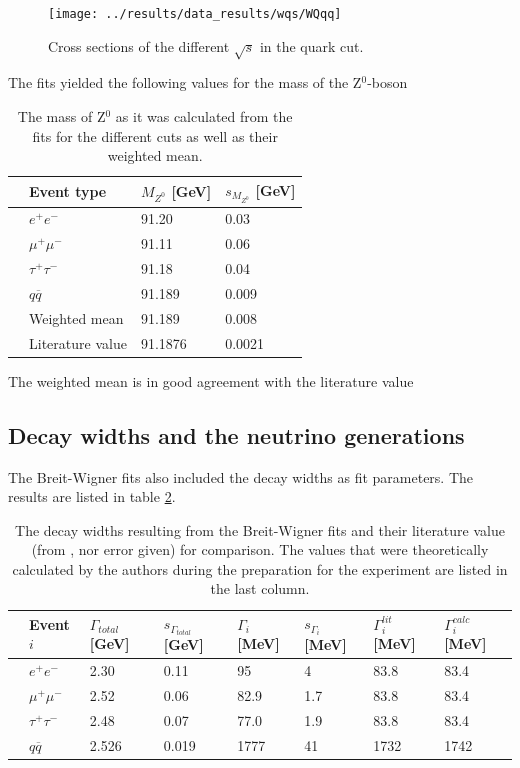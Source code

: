 \begin{figure}[H]
\centering
\texttt{[image: ../results/data\_results/wqs/WQqq]}
\caption[Cross sections for quark cut]{Cross sections of the different $\sqrt{s}$ in the quark cut.}
\label{fig:WQqq}
\end{figure}
\newpage
The fits yielded the following values for the mass of the Z$^0$-boson
\begin{table}[H]\centering
	\begin{tabular}{@{}llll@{}}
		\toprule
		&Event type&$M_{Z^0}$ [GeV]&$s_{M_{Z^0}}$ [GeV]\\
		\midrule
		&$e^+e^-$&91.20&0.03\\
		&$\mu^+\mu^-$&91.11&0.06\\
		&$\tau^+\tau^-$&91.18&0.04\\
		&$q\overline{q}$&91.189&0.009\\
		\midrule
		&Weighted mean&91.189&0.008\\
		&Literature value&91.1876&0.0021\\
		\bottomrule
	\end{tabular}
	\caption[Breit-Wigner fit results: $M_{Z^0}$]{The mass of Z$^0$ as it was calculated from the fits for the different cuts as well as their weighted mean.}
	\label{tb:Z0massfitresults}
\end{table}

The weighted mean is in good agreement with the literature value

\subsection{Decay widths and the neutrino generations}
The Breit-Wigner fits also included the decay widths as fit parameters. The results are listed in table \ref{tb:decaywidthfitresults}.  

\begin{table}[H]\centering
	\begin{tabular}{@{}llllllll@{}}
		\toprule
		&Event $i$&$\Gamma_{total}$ [GeV]&$s_{\Gamma_{total}}$ [GeV]&$\Gamma_i$ [MeV]&$s_{\Gamma_i}$ [MeV]&$\Gamma^{lit}_i$ [MeV]&$\Gamma^{calc}_i$ [MeV]\\
		\midrule
		&$e^+e^-$&2.30&0.11&95&4&83.8&83.4\\
		&$\mu^+\mu^-$&2.52&0.06&82.9&1.7&83.8&83.4\\
		&$\tau^+\tau^-$&2.48&0.07&77.0&1.9&83.8&83.4\\
		&$q\overline{q}$&2.526&0.019&1777&41&1732&1742\\
		\bottomrule
	\end{tabular}
	\caption[Breit-Wigner fit results: Decay widths ]{The decay widths resulting from the Breit-Wigner fits and their literature value (from \cite{staatsex}, nor error given) for comparison. The values that were theoretically calculated by the authors during the preparation for the experiment are listed in the last column.}
	\label{tb:decaywidthfitresults}
\end{table}

